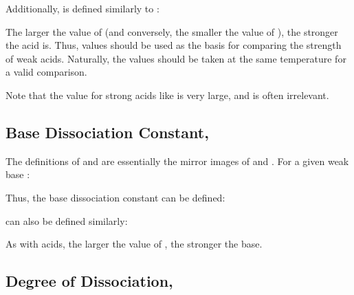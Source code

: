 			Additionally, \pKa{} is defined similarly to \pKw{}:


			The larger the value of \Ka{} (and conversely, the smaller the value of \pKa{}), the stronger the acid is. Thus, \Ka{}
			values should be used as the basis for comparing the strength of weak acids. Naturally, the \Ka{} values should be
			taken at the same temperature for a valid comparison.

			Note that the \Ka{} value for strong acids like  is very large, and is often irrelevant.





		\pagebreak
		\subsection{Base Dissociation Constant, \MKb{}}

			The definitions of \Kb{} and \pKb{} are essentially the mirror images of \Ka{} and \pKa{}. For a given weak base :


			Thus, the base dissociation constant \Kb{} can be defined:


			\pKb{} can also be defined similarly:


			As with acids, the larger the value of \Kb{}, the stronger the base.



		\subsection{Degree of Dissociation, \chemalpha}

